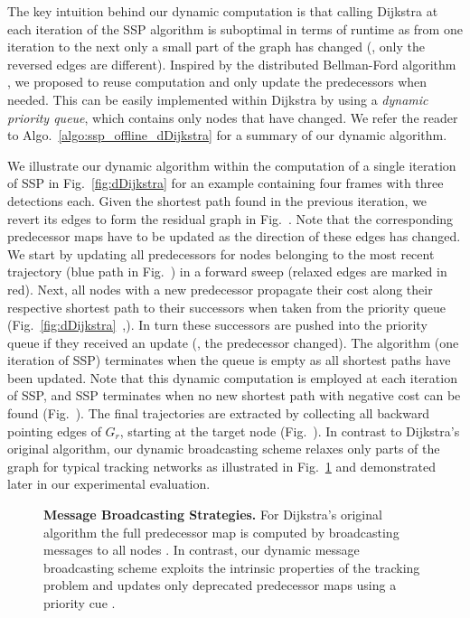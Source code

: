 \documentclass[10pt,twocolumn,letterpaper]{article}
\newcommand{\figref}[1]{Fig.~\ref{#1}}
\newcommand{\subfigref}[1]{Fig.~\subref*{#1}}
\newcommand{\algref}[1]{Algo.~\ref{#1}}
\begin{document}
The  key intuition behind our dynamic computation is that calling Dijkstra at each iteration of the SSP algorithm is suboptimal in terms of runtime as from one iteration to the next only a small part of the graph has changed (\ie, only the  reversed edges are different). 
Inspired by the distributed Bellman-Ford algorithm 
\cite{Bertsekas1992,Walden2003}, we proposed to reuse computation and  only update the  predecessors when needed. This can be easily implemented within Dijkstra by using a {\it dynamic priority queue}, which contains only nodes that have changed.  
We refer the reader to \algref{algo:ssp_offline_dDijkstra} for a summary of our dynamic algorithm. 

We illustrate our dynamic algorithm  within the computation of a single iteration of SSP in \figref{fig:dDijkstra} for an example containing four frames with three detections each. 
Given the shortest path found in the previous iteration, we revert its edges to form the residual graph in \subfigref{fig:dDijkstra:a}. Note that the corresponding predecessor maps have to be updated as the direction of these edges has changed. 
We start by updating all predecessors for nodes belonging to the most recent trajectory (blue path in \subfigref{fig:dDijkstra:a}) in a forward sweep (relaxed edges are marked in red). Next, all nodes with a new predecessor propagate their cost along their respective shortest path to their successors when taken from the priority queue (\figref{fig:dDijkstra}~,). 
In turn these successors are pushed into the priority queue if they received an update (\ie, the predecessor changed). 
The algorithm (one iteration of SSP) terminates when the queue is empty as all shortest paths have been updated.
Note that this dynamic computation is employed at each iteration of SSP, and  
SSP  terminates when no new shortest path with negative cost can be found (\subfigref{fig:dDijkstra:d}). The final trajectories are  extracted by collecting all backward pointing edges of $G_r$, starting at the target node (\subfigref{fig:dDijkstra:e}).
In contrast to Dijkstra's original algorithm, our dynamic broadcasting scheme relaxes only parts of the graph for typical tracking networks as illustrated in \figref{fig:dDijkstraComparison} and demonstrated later in our experimental evaluation.

\begin{figure}[t!]
\centering
{}
\qquad
{}
\caption{{\bf Message Broadcasting Strategies.} For Dijkstra's original algorithm the full predecessor map is computed by broadcasting messages to all nodes \protect{}. In contrast, our dynamic message broadcasting scheme exploits the intrinsic properties of the tracking problem and updates only deprecated predecessor maps using a priority cue \protect{}.}
\label{fig:dDijkstraComparison}
\end{figure}
\end{document}
